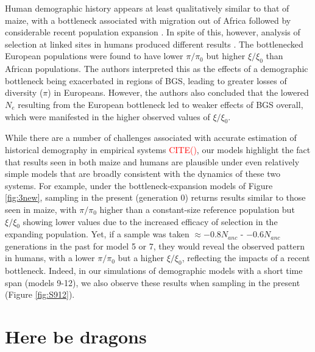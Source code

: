 \documentclass[9pt,twocolumn,twoside]{rilabRxiv}
\newcommand{\citex}[1]{{\small \textcolor{red}{CITE(#1)}}}
\begin{document}
Human demographic history appears at least qualitatively similar to that of maize, with a bottleneck associated with migration out of Africa followed by considerable recent population expansion \citep{tennessen2012evolution}.
In spite of this, however, analysis of selection at linked sites in humans produced different results \citep{torres2018human}.
The bottlenecked European populations were found to have lower $\pi/\pi_0$ but higher $\xi/\xi_0$ than African populations. The authors interpreted this as the effects of a demographic bottleneck being exacerbated in regions of BGS, leading to greater losses of diversity ($\pi$) in Europeans. However, the authors also concluded that the lowered $N_e$ resulting from the European bottleneck led to weaker effects of BGS overall, which were manifested in the higher observed values of $\xi/\xi_0$.

While there are a number of challenges associated with accurate estimation of historical demography in empirical systems \citex{}, our models highlight the fact that results seen in both maize and humans are plausible under even relatively simple models that are broadly consistent with the dynamics of these two systems.
For example, under the bottleneck-expansion models of Figure \ref{fig:3new}, sampling in the present (generation 0) returns results similar to those seen in maize, with $\pi/\pi_0$ higher than a constant-size reference population but $\xi/\xi_0$ showing lower values due to the increased efficacy of selection in the expanding population.
Yet, if a sample was taken $\approx -0.8N_{anc}$ - $-0.6N_{anc}$ generations in the past for model 5 or 7, they would reveal the observed pattern in humans, with a lower $\pi/\pi_0$ but a higher $\xi/\xi_0$, reflecting the impacts of a recent bottleneck. Indeed, in our simulations of demographic models with a short time span (models 9-12), we also observe these results when sampling in the present (Figure \ref{fig:S912}).



\section{Here be dragons}
\end{document}
